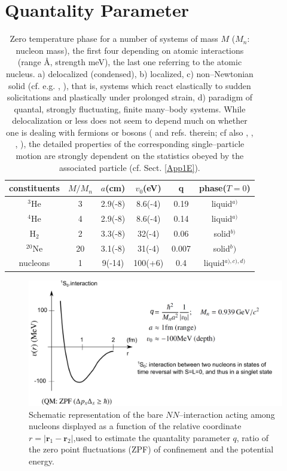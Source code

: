 \section{Quantality Parameter}\label{App1A}
\begin{table}
 \begin{tabular}{|c|c|c|c|c|c|}
 \hline \rule[-2ex]{0pt}{5.5ex}   constituents& $M/M_n$  & $a$(cm) &$v_0$(eV)  &q&phase($T=0$)    \\ 
 \hline \rule[-2ex]{0pt}{5.5ex}   $^{3}$He &3& 2.9(-8)  &8.6(-4)  &0.19  &liquid$^{a)}$    \\ 
 \hline \rule[-2ex]{0pt}{5.5ex}  $^{4}$He  &4&  2.9(-8)&  8.6(-4)&  0.14& liquid$^{a)}$   \\ 
 \hline \rule[-2ex]{0pt}{5.5ex}    H$_2$&2&  3.3(-8)&  32(-4)&  0.06&solid$^{b)}$   \\ 
 \hline \rule[-2ex]{0pt}{5.5ex}    $^{20}$Ne&20& 3.1(-8) &  31(-4)&  0.007&solid$^b)$    \\ 
 \hline \rule[-2ex]{0pt}{5.5ex}    nucleons&1&  9(-14)& 100(+6) &  0.4&liquid$^{a),c),d)}$  \\ 
 \hline 
 \end{tabular}
 \caption{Zero temperature phase for a number of systems of mass $M$ ($M_n$: nucleon mass), the first four depending on atomic interactions (range \AA, strength meV), the last one referring to the atomic nucleus. a) delocalized (condensed), b) localized, c) non--Newtonian solid (cf. e.g. \cite{Bertsch:88b}, \cite{DeGennes:94}), that is, systems which react elastically to sudden solicitations and plastically under prolonged strain, d) paradigm of quantal, strongly fluctuating, finite many--body  systems. While delocalization or less does not seem to depend much on whether one is dealing with fermions or bosons (\cite{Mottelson:02} and refs. therein; cf also \cite{Ebran:14}, \cite{Ebran:14b}, \cite{Ebran:13}, \cite{Ebran:12}), the detailed properties of the corresponding single--particle motion are strongly dependent on the statistics obeyed by the associated particle (cf. Sect. \ref{App1E}).}\label{tab1A1}
 \end{table}
 \begin{figure}
 \centerline{\includegraphics*[width=\textwidth,angle=0]{nutshell/figs/potential.pdf}}
 \caption{Schematic representation of the bare $NN$--interaction acting among nucleons displayed as a function of the relative coordinate $r=|\mathbf{r}_1-\mathbf{r}_2|$,used to estimate the quantality parameter $q$, ratio of the zero point fluctuations (ZPF) of confinement and the potential energy.}\label{fig1A1}
 \end{figure}
